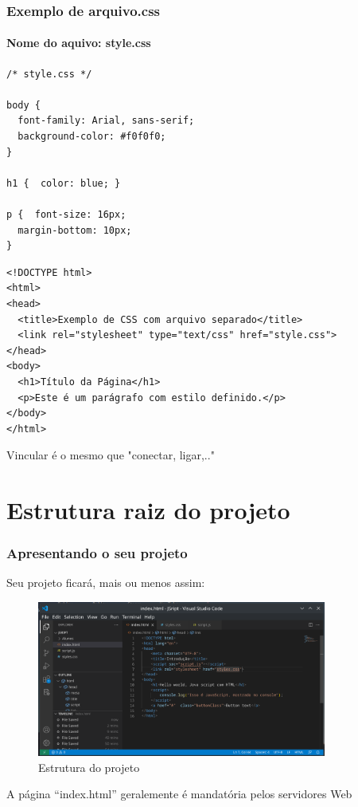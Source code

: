 \documentclass[13pt, xcolor={dvipsnames,svgnames}, portuguese]{beamer}
\begin{document}
\begin{frame}[fragile]
\frametitle{Exemplo de arquivo.css}
\framesubtitle{Nome do aquivo: style.css}

\begin{verbatim}
/* style.css */

body {
  font-family: Arial, sans-serif;
  background-color: #f0f0f0;
}

h1 {  color: blue; }

p {  font-size: 16px;
  margin-bottom: 10px;
}

\end{verbatim}
\end{frame}
\begin{frame}[fragile]

\begin{verbatim}
<!DOCTYPE html>
<html>
<head>
  <title>Exemplo de CSS com arquivo separado</title>
  <link rel="stylesheet" type="text/css" href="style.css">
</head>
<body>
  <h1>Título da Página</h1>
  <p>Este é um parágrafo com estilo definido.</p>
</body>
</html>
\end{verbatim}
Vincular é o mesmo que "conectar, ligar,.."

\end{frame}

\section{Estrutura raiz do projeto}
\begin{frame}
\frametitle{Apresentando o seu projeto}

Seu projeto ficará, mais ou menos assim:
\begin{figure}
  \includegraphics[width=0.85\textwidth]{Figuras/estruturaSite.png}
  \caption{Estrutura do projeto}
\end{figure}
A página ``index.html'' geralemente é mandatória pelos servidores Web
\end{frame}
\end{document}

